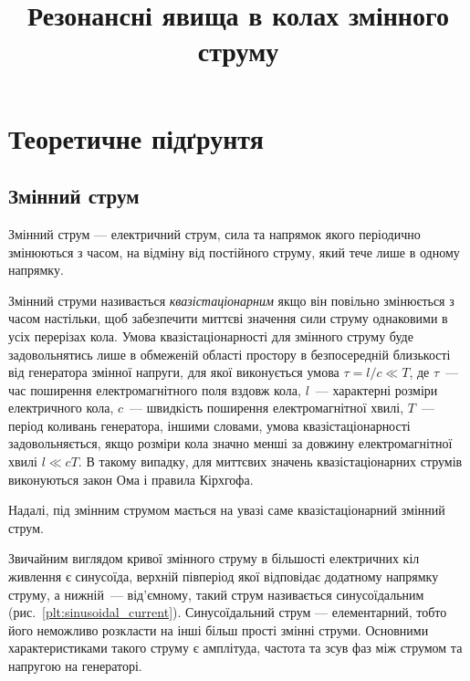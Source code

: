 \documentclass[]{LabWork}
\title{Резонансні явища в колах змінного струму}
\begin{document}
\writedatatofile{\jobname}
\maketitle

\nocite{Mat3, FLF6, AleshkevichElectro, Ledenev4, berkeley2}
\printbibliography


\section{Теоретичне підґрунтя}

\subsection{Змінний струм}

Змінний струм --- електричний струм, сила та напрямок якого періодично змінюються з часом, на відміну від постійного струму, який тече лише в одному напрямку.

\noindent\bigskip%
\begin{More}

	Змінний струми називається \emph{квазістаціонарним} якщо він повільно змінюється з часом настільки, щоб забезпечити миттєві значення сили струму однаковими в усіх перерізах кола. Умова квазістаціонарності для змінного струму буде задовольнятись лише в обмеженій області простору в безпосередній близькості від генератора змінної напруги, для якої виконується умова $\tau = l/c \ll T$, де $\tau$~--- час поширення електромагнітного поля вздовж кола, $l$~--- характерні розміри електричного кола, $c$~--- швидкість поширення електромагнітної хвилі, $T$~--- період коливань генератора, іншими словами, умова квазістаціонарності задовольняється, якщо розміри кола значно менші за довжину електромагнітної хвилі $l \ll cT$. В такому випадку, для миттєвих значень квазістаціонарних струмів виконуються закон Ома і правила Кірхгофа.

	Надалі, під змінним струмом мається на увазі саме квазістаціонарний змінний струм.

\end{More}

Звичайним виглядом кривої змінного струму в більшості електричних кіл живлення є синусоїда, верхній півперіод якої відповідає додатному напрямку струму, а нижній~--- від'ємному, такий струм називається синусоїдальним (рис.~\ref{plt:sinusoidal_current}). Синусоїдальний струм --- елементарний, тобто його неможливо розкласти на інші більш прості змінні струми. Основними характеристиками такого струму є амплітуда, частота та зсув фаз між струмом та напругою на генераторі.
\end{document}
